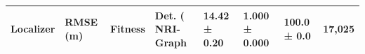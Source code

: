 \begin{tabular}{lllll}
\toprule
Localizer & RMSE (m) & Fitness & Det. (%
\midrule
NRI-Graph & 14.42 ± 0.20 & 1.000 ± 0.000 & 100.0 ± 0.0 & 17,025 \\
\bottomrule
\end{tabular}
